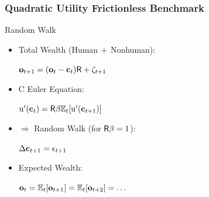 \documentclass{beamer}\usepackage{dcolumn}
\newcommand{\jemph}[1]{{\color{StataDarkBlue}#1}}
\providecommand{\jemph}[1]{{\color{jirkasblue}#1}}
\begin{document}
\begin{frame}
\frametitle{Quadratic Utility Frictionless Benchmark}

\begin{block}{\cite{hallRandomWalk} Random Walk}
\phantom{.}
\begin{itemize}
\item \jemph{Total Wealth} (Human$\,+\,$Nonhuman):\\
\begin{center}
{$\mathbf{o}_{t+1} = (\mathbf{o}_{t}-\mathbf{c}_{t})\mathsf{R}+\zeta_{t+1}$}
\end{center}
\item \jemph{C Euler Equation}: \\
\begin{center}
{${\mathrm{u}}^{\prime}(\mathbf{c}_{t}) = \mathsf{R}\beta \mathbb{E}_{t}[{\mathrm{u}}^{\prime}(\mathbf{c}_{t+1})]$}
\end{center}
\item $\Rightarrow$ \jemph{Random Walk} (for $\mathsf{R}\beta=1$): \\
\begin{center}
{$\Delta \mathbf{c}_{t+1} = \epsilon_{t+1}$}
\end{center}
\item \jemph{Expected Wealth}: \\
\begin{center}
{$\mathbf{o}_{t} = \mathbb{E}_{t}[\mathbf{o}_{t+1}] = \mathbb{E}_{t}[\mathbf{o}_{t+2}] = \dots$}
\end{center}
\end{itemize}
\end{block}

\end{frame}
\end{document}
